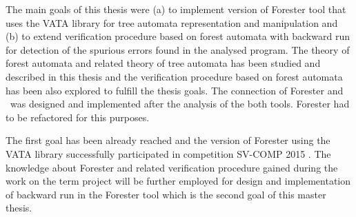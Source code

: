 The main goals of this thesis were (a) to implement version of Forester tool that uses the VATA library for tree automata representation and manipulation
and (b) to extend verification procedure based on forest automata with backward run for detection of the spurious errors found in the analysed program.
The theory of forest automata and related theory of tree automata has been studied and described in this thesis and the verification procedure
based on forest automata has been also explored to fulfill the thesis goals.
The connection of Forester and \vata\ was designed and implemented after the analysis of the both tools.
Forester had to be refactored for this purposes.

The first goal has been already reached and the version of Forester using the VATA library successfully participated in competition SV-COMP 2015 \cite{www:svcomp}.
The knowledge about Forester and related verification procedure gained during the work on the term project will be further employed for design
and implementation of backward run in the Forester tool which is the second goal of this master thesis.

